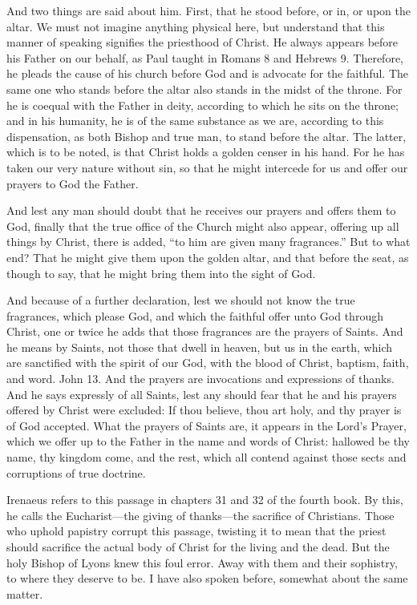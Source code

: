And two things are said about him. First, that he stood before, or in, or upon the altar. We must not imagine anything physical here, but understand that this manner of speaking signifies the priesthood of Christ. He always appears before his Father on our behalf, as Paul taught in Romans 8 and Hebrews 9. Therefore, he pleads the cause of his church before God and is advocate for the faithful. The same one who stands before the altar also stands in the midst of the throne. For he is coequal with the Father in deity, according to which he sits on the throne; and in his humanity, he is of the same substance as we are, according to this dispensation, as both Bishop and true man, to stand before the altar. The latter, which is to be noted, is that Christ holds a golden censer in his hand. For he has taken our very nature without sin, so that he might intercede for us and offer our prayers to God the Father.

And lest any man should doubt that he receives our prayers and offers them to God, finally that the true office of the Church might also appear, offering up all things by Christ, there is added, “to him are given many fragrances.” But to what end? That he might give them upon the golden altar, and that before the seat, as though to say, that he might bring them into the sight of God.

And because of a further declaration, lest we should not know the true fragrances, which please God, and which the faithful offer unto God through Christ, one or twice he adds that those fragrances are the prayers of Saints. And he means by Saints, not those that dwell in heaven, but us in the earth, which are sanctified with the spirit of our God, with the blood of Christ, baptism, faith, and word. John 13. And the prayers are invocations and expressions of thanks. And he says expressly of all Saints, lest any should fear that he and his prayers offered by Christ were excluded: If thou believe, thou art holy, and thy prayer is of God accepted. What the prayers of Saints are, it appears in the Lord’s Prayer, which we offer up to the Father in the name and words of Christ: hallowed be thy name, thy kingdom come, and the rest, which all contend against those sects and corruptions of true doctrine.

Irenaeus refers to this passage in chapters 31 and 32 of the fourth book. By this, he calls the Eucharist—the giving of thanks—the sacrifice of Christians. Those who uphold papistry corrupt this passage, twisting it to mean that the priest should sacrifice the actual body of Christ for the living and the dead. But the holy Bishop of Lyons knew this foul error. Away with them and their sophistry, to where they deserve to be. I have also spoken before, somewhat about the same matter.

